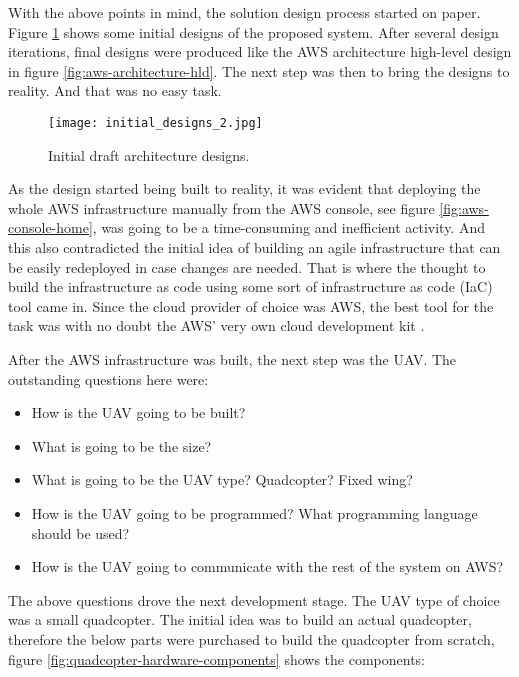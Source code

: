 With the above points in mind, the solution design process started on paper. Figure \ref{fig:initial-draft-designs} shows some initial designs of the proposed system. After several design iterations, final designs were produced like the AWS architecture high-level design in figure \ref{fig:aws-architecture-hld}. The next step was then to bring the designs to reality. And that was no easy task.

\begin{figure}[H]
    \centering \texttt{[image: initial\_designs\_2.jpg]}
    \caption{Initial draft architecture designs.}
    \label{fig:initial-draft-designs}
\end{figure}

As the design started being built to reality, it was evident that deploying the whole AWS infrastructure manually from the AWS console, see figure \ref{fig:aws-console-home}, was going to be a time-consuming and inefficient activity. And this also contradicted the initial idea of building an agile infrastructure that can be easily redeployed in case changes are needed. That is where the thought to build the infrastructure as code using some sort of infrastructure as code (IaC) tool came in. Since the cloud provider of choice was AWS, the best tool for the task was with no doubt the AWS' very own cloud development kit \cite{awscdkdocumentation}.

After the AWS infrastructure was built, the next step was the UAV. The outstanding questions here were:

\begin{itemize}
    \item How is the UAV going to be built?
    \item What is going to be the size?
    \item What is going to be the UAV type? Quadcopter? Fixed wing?
    \item How is the UAV going to be programmed? What programming language should be used?
    \item How is the UAV going to communicate with the rest of the system on AWS?
\end{itemize}

The above questions drove the next development stage. The UAV type of choice was a small quadcopter. The initial idea was to build an actual quadcopter, therefore the below parts were purchased to build the quadcopter from scratch, figure \ref{fig:quadcopter-hardware-components} shows the components:


